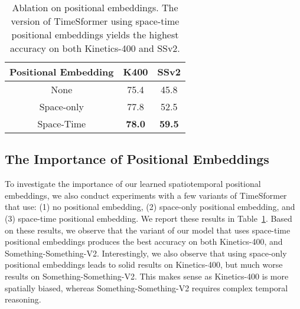 \documentclass{article}
\begin{document}
 
 \begin{table}
\centering
{\scriptsize
 \begin{tabular}{c c c }
 \hline
{Positional Embedding} & {K400} & {SSv2} \\ 
 \hline
None & 75.4  & 45.8 \\
Space-only & 77.8  & 52.5 \\
Space-Time & \bf 78.0 & \bf 59.5\\
 \hline
 \end{tabular}
 }
  \vspace{-0.1cm}
\caption{Ablation on positional embeddings. The version of TimeSformer using space-time positional embeddings yields the highest accuracy on both Kinetics-400 and SSv2.\vspace{-0.1cm}}
\label{pos_results_table}
 \end{table}
 













\subsection{The Importance of Positional Embeddings} 





To investigate the importance of our learned spatiotemporal positional embeddings, we also conduct experiments with a few variants of TimeSformer that use: (1) no positional embedding, (2) space-only positional embedding, and (3) space-time positional embedding. We report these results in Table~\ref{pos_results_table}. Based on these results, we observe that the variant of our model that uses space-time positional embeddings produces the best accuracy on both Kinetics-400, and Something-Something-V2. Interestingly, we also observe that using space-only positional embeddings leads to solid results on Kinetics-400, but much worse results on Something-Something-V2. This makes sense as Kinetics-400 is more spatially biased, whereas Something-Something-V2 requires complex temporal reasoning.
\end{document}
